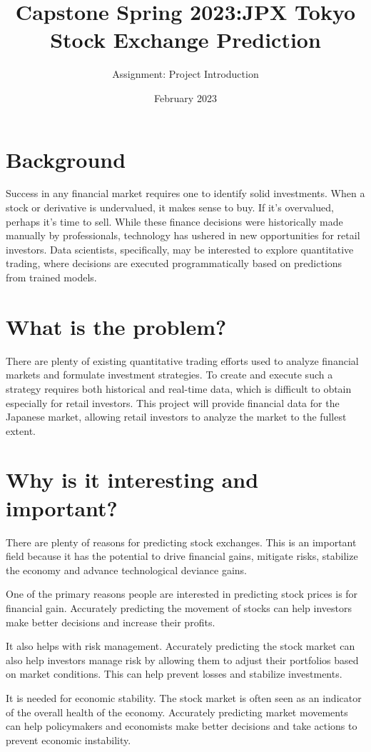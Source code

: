 \documentclass{article}
\title{Capstone Spring 2023:JPX Tokyo Stock Exchange Prediction}
\author{Assignment: Project Introduction}
\date{February  2023}
\begin{document}
\maketitle


\section{Background}
Success in any financial market requires one to identify solid investments. When a stock or derivative is undervalued, it makes sense to buy. If it's overvalued, perhaps it's time to sell. While these finance decisions were historically made manually by professionals, technology has ushered in new opportunities for retail investors. Data scientists, specifically, may be interested to explore quantitative trading, where decisions are executed programmatically based on predictions from trained models.

\section{What is the problem?}
There are plenty of existing quantitative trading efforts used to analyze financial markets and formulate investment strategies. To create and execute such a strategy requires both historical and real-time data, which is difficult to obtain especially for retail investors. This project will provide financial data for the Japanese market, allowing retail investors to analyze the market to the fullest extent.


\section{Why is it interesting and important?}
There are plenty of reasons for predicting stock exchanges. This is an important field because it has the potential to drive financial gains, mitigate risks, stabilize the economy and advance technological deviance gains.

One of the primary reasons people are interested in predicting stock prices is for financial gain. Accurately predicting the movement of stocks can help investors make better decisions and increase their profits.

It also helps with risk management. Accurately predicting the stock market can also help investors manage risk by allowing them to adjust their portfolios based on market conditions. This can help prevent losses and stabilize investments.

It is needed for economic stability. The stock market is often seen as an indicator of the overall health of the economy. Accurately predicting market movements can help policymakers and economists make better decisions and take actions to prevent economic instability.
\end{document}
